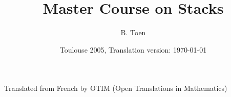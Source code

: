 \documentclass{amsbook}
\title{Master Course on Stacks}
\author{B. Toen}
\date{Toulouse 2005, Translation version: \today}
\begin{document}
\maketitle
Translated from French by OTIM (Open Translations in Mathematics)
\tableofcontents{}

\end{document}
